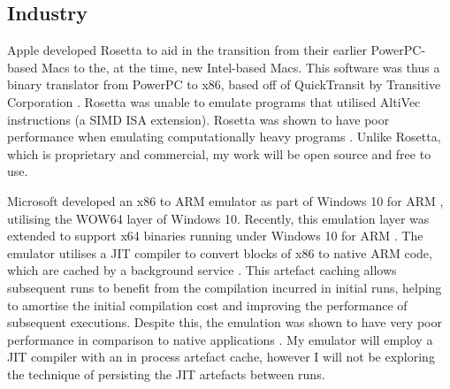 \subsection{Industry}

Apple developed Rosetta \cite{apple-rosetta} to aid in the transition from their earlier PowerPC-based Macs to the, at the time, new Intel-based Macs. This software was thus a binary translator from PowerPC to x86, based off of QuickTransit by Transitive Corporation \cite{cnet-rosetta}. Rosetta was unable to emulate programs that utilised AltiVec instructions (a SIMD ISA extension). Rosetta was shown to have poor performance when emulating computationally heavy programs \cite{rosetta-perf}. Unlike Rosetta, which is proprietary and commercial, my work will be open source and free to use.

Microsoft developed an x86 to ARM emulator as part of Windows 10 for ARM \cite{docs-win10-arm-emu}, utilising the WOW64 \cite{WOW64} layer of Windows 10. Recently, this emulation layer was extended to support x64 binaries running under Windows 10 for ARM \cite{win10-arm-x64-emu}. The emulator utilises a JIT compiler to convert blocks of x86 to native ARM code, which are cached by a background service \cite{docs-win10-arm-emu, blackberry-win10-arm-emu}. This artefact caching allows subsequent runs to benefit from the compilation incurred in initial runs, helping to amortise the initial compilation cost and improving the performance of subsequent executions. Despite this, the emulation was shown to have very poor performance in comparison to native applications \cite{win10-arm-x64-emu-perf1, win10-arm-x64-emu-perf2}. My emulator will employ a JIT compiler with an in process artefact cache, however I will not be exploring the technique of persisting the JIT artefacts between runs.

